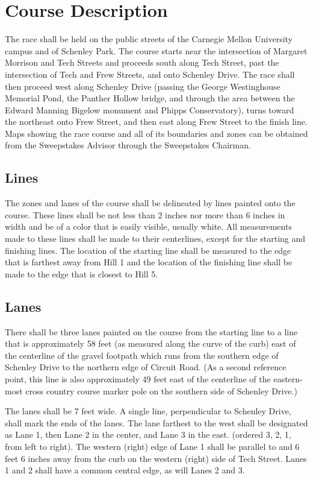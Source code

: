 \chapter{Course Description}

	The race shall be held on the public streets of the Carnegie Mellon University campus and of Schenley Park. The course starts near the intersection of Margaret Morrison and Tech Streets and proceeds south along Tech Street, past the intersection of Tech and Frew Streets, and onto Schenley Drive. The race shall then proceed west along Schenley Drive (passing the George Westinghouse Memorial Pond, the Panther Hollow bridge, and through the area between the Edward Manning Bigelow monument and Phipps Conservatory), turns toward the northeast onto Frew Street, and then east along Frew Street to the finish line. Maps showing the race course and all of its boundaries and zones can be obtained from the Sweepstakes Advisor through the Sweepstakes Chairman.

\section{Lines}

	The zones and lanes of the course shall be delineated by lines painted onto the course. These lines shall be not less than 2 inches nor more than 6 inches in width and be of a color that is easily visible, usually white. All measurements made to these lines shall be made to their centerlines, except for the starting and finishing lines. The location of the starting line shall be measured to the edge that is farthest away from Hill 1 and the location of the finishing line shall be made to the edge that is closest to Hill 5.

\section{Lanes}

	There shall be three lanes painted on the course from the starting line to a line that is approximately 58 feet (as measured along the curve of the curb) east of the centerline of the gravel footpath which runs from the southern edge of Schenley Drive to the northern edge of Circuit Road. (As a second reference point, this line is also approximately 49 feet east of the centerline of the eastern-most cross country course marker pole on the southern side of Schenley Drive.)

	The lanes shall be 7 feet wide. A single line, perpendicular to Schenley Drive, shall mark the ends of the lanes. The lane farthest to the west shall be designated as Lane 1, then Lane 2 in the center, and Lane 3 in the east. (ordered 3, 2, 1, from left to right). The western (right) edge of Lane 1 shall be parallel to and 6 feet 6 inches away from the curb on the western (right) side of Tech Street. Lanes 1 and 2 shall have a common central edge, as will Lanes 2 and 3.

